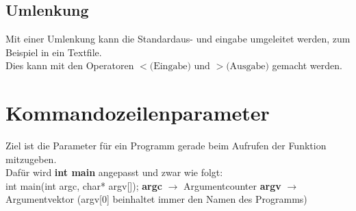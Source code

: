 \documentclass{article}
\begin{document}
\subsection{Umlenkung}
Mit einer Umlenkung kann die Standardaus- und eingabe umgeleitet werden, zum Beispiel in ein Textfile. \\
Dies kann mit den Operatoren $< \textrm{(Eingabe) und } > \textrm{(Ausgabe)}$ gemacht werden. 
\section{Kommandozeilenparameter}
Ziel ist die Parameter für ein Programm gerade beim Aufrufen der Funktion mitzugeben. \\
Dafür wird \textbf{int main} angepasst und zwar wie folgt: \\
int main(int argc, char* argv[]);
\textbf{argc} $\rightarrow$ Argumentcounter
\textbf{argv} $\rightarrow$ Argumentvektor (argv[0] beinhaltet immer den Namen des Programms)
\end{document}
